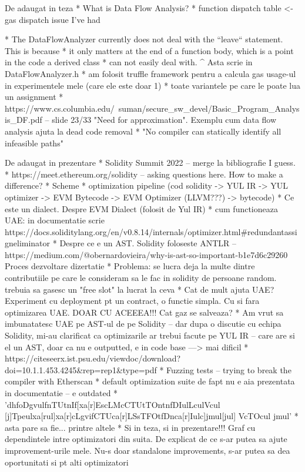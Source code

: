 De adaugat in teza
* What is Data Flow Analysis?
* function dispatch table <- gas dispatch issue I've had

  * The DataFlowAnalyzer currently does not deal with the ``leave`` statement. This is because
  * it only matters at the end of a function body, which is a point in the code a derived class
  * can not easily deal with.
  ^ Asta scrie in DataFlowAnalyzer.h
* am folosit truffle framework pentru a calcula gas usage-ul in experimentele mele (care ele este doar 1)
* toate variantele pe care le poate lua un assignment
* https://www.cs.columbia.edu/~suman/secure_sw_devel/Basic_Program_Analysis_DF.pdf – slide 23/33 "Need for approximation". Exemplu cum data flow analysis ajuta la dead code removal
  * "No compiler can statically identify all infeasible paths"


De adaugat in prezentare
* Solidity Summit 2022 – merge la bibliografie I guess.
* https://meet.ethereum.org/solidity – asking questions here. How to make a difference?
* Scheme
  * optimization pipeline (cod solidity -> YUL IR -> YUL optimizer -> EVM Bytecode -> EVM Optimizer (LLVM???) -> bytecode)
* Ce este un dialect. Despre EVM Dialect (folosit de Yul IR)
* cum functioneaza UAE: in documentatie scrie https://docs.soliditylang.org/en/v0.8.14/internals/optimizer.html#redundantassigneliminator
* Despre ce e un AST. Solidity foloseste ANTLR – https://medium.com/@obernardovieira/why-is-ast-so-important-b1e7d6c29260
Proces dezvoltare dizertatie
* Problema: se lucra deja la multe dintre contributiile pe care le consideram sa le fac in solidity de persoane random. trebuia sa gasesc un "free slot" la lucrat la ceva
* Cat de mult ajuta UAE? Experiment cu deployment pt un contract, o functie simpla. Cu si fara optimizarea UAE. DOAR CU ACEEEA!!! Cat gaz se salveaza?
* Am vrut sa imbunatatesc UAE pe AST-ul de pe Solidity – dar dupa o discutie cu echipa Solidity, mi-au clarificat ca optimizarile ar trebui facute pe YUL IR – care are si el un AST, doar ca nu e outputted, e in code base ---> mai dificil
* https://citeseerx.ist.psu.edu/viewdoc/download?doi=10.1.1.453.4245&rep=rep1&type=pdf 
* Fuzzing tests – trying to break the compiler with Etherscan
* default optimization suite de fapt nu e aia prezentata in documentatie – e outdated
  * 'dhfoDgvulfnTUtnIf[xa[r]EscLMcCTUtTOntnfDIulLculVcul [j]Tpeulxa[rul]xa[r]cLgvifCTUca[r]LSsTFOtfDnca[r]Iulc]jmul[jul] VcTOcul jmul'
  * asta pare sa fie... printre altele
* Si in teza, si in prezentare!!! Graf cu dependintele intre optimizatori din suita. De explicat de ce s-ar putea sa ajute improvement-urile mele. Nu-s doar standalone improvements, s-ar putea sa dea oportunitati si pt alti optimizatori

